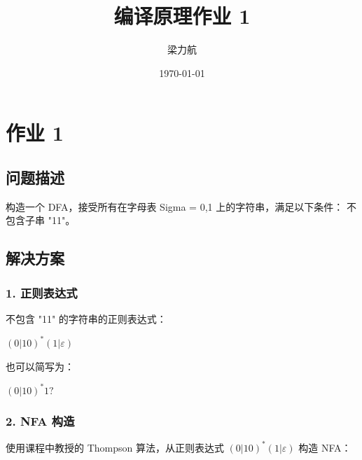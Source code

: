 \documentclass{article}
\title{编译原理作业 1}
\author{梁力航}
\date{\today}
\begin{document}
\maketitle

\section{作业 1}

\subsection{问题描述}
构造一个 DFA，接受所有在字母表 Sigma = {0,1} 上的字符串，满足以下条件：
不包含子串 "11"。

\subsection{解决方案}

\subsubsection{1. 正则表达式}

不包含 "11" 的字符串的正则表达式：
\begin{center}
$(0 | 10)^*(1 | \varepsilon)$
\end{center}

也可以简写为：
\begin{center}
$(0 | 10)^*1?$
\end{center}

\subsubsection{2. NFA 构造}

使用课程中教授的 Thompson 算法，从正则表达式 $(0 | 10)^*(1 | \varepsilon)$ 构造 NFA：
\end{document}
